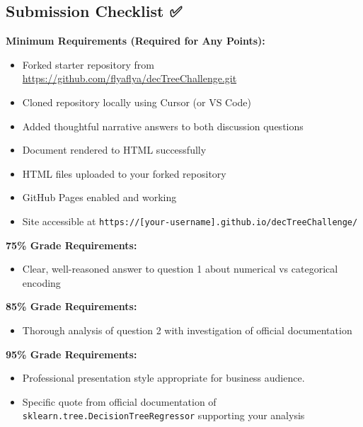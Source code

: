 \documentclass[
  letterpaper,
  DIV=11,
  numbers=noendperiod]{scrartcl}
\providecommand{\tightlist}{%
  \setlength{\itemsep}{0pt}\setlength{\parskip}{0pt}}
\begin{document}
\subsection{Submission Checklist ✅}\label{submission-checklist}

\textbf{Minimum Requirements (Required for Any Points):}

\begin{itemize}
\tightlist
\item[$\square$]
  Forked starter repository from
  \url{https://github.com/flyaflya/decTreeChallenge.git}
\item[$\square$]
  Cloned repository locally using Cursor (or VS Code)
\item[$\square$]
  Added thoughtful narrative answers to both discussion questions
\item[$\square$]
  Document rendered to HTML successfully
\item[$\square$]
  HTML files uploaded to your forked repository
\item[$\square$]
  GitHub Pages enabled and working
\item[$\square$]
  Site accessible at
  \texttt{https://{[}your-username{]}.github.io/decTreeChallenge/}
\end{itemize}

\textbf{75\% Grade Requirements:}

\begin{itemize}
\tightlist
\item[$\square$]
  Clear, well-reasoned answer to question 1 about numerical vs
  categorical encoding
\end{itemize}

\textbf{85\% Grade Requirements:}

\begin{itemize}
\tightlist
\item[$\square$]
  Thorough analysis of question 2 with investigation of official
  documentation
\end{itemize}

\textbf{95\% Grade Requirements:}

\begin{itemize}
\tightlist
\item[$\square$]
  Professional presentation style appropriate for business audience.
\item[$\square$]
  Specific quote from official documentation of
  \texttt{sklearn.tree.DecisionTreeRegressor} supporting your analysis
\end{itemize}
\end{document}
